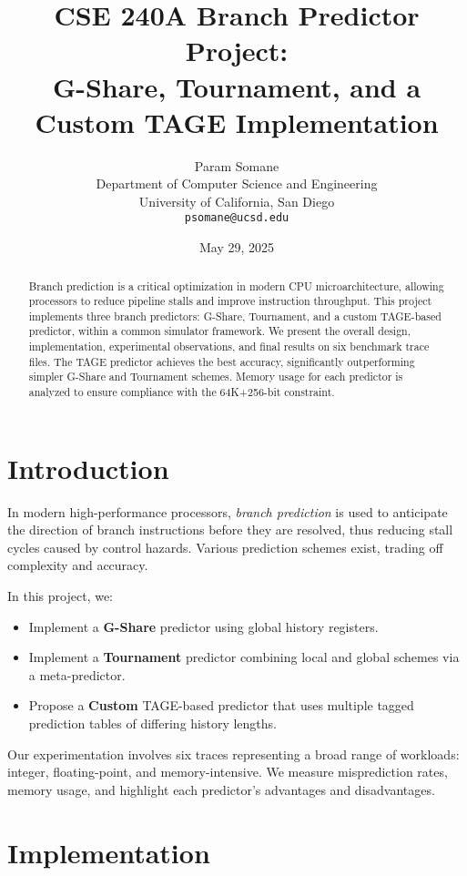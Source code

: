 \documentclass[11pt]{article}
\title{CSE 240A Branch Predictor Project:\\
G-Share, Tournament, and a Custom TAGE Implementation}
\author{%
  Param Somane \\
  Department of Computer Science and Engineering \\
  University of California, San Diego \\
  \texttt{psomane@ucsd.edu}
}
\date{May 29, 2025}
\begin{document}
\maketitle

\begin{abstract}
Branch prediction is a critical optimization in modern CPU microarchitecture, allowing processors to reduce pipeline stalls and improve instruction throughput. This project implements three branch predictors: G-Share, Tournament, and a custom TAGE-based predictor, within a common simulator framework. We present the overall design, implementation, experimental observations, and final results on six benchmark trace files. The TAGE predictor achieves the best accuracy, significantly outperforming simpler G-Share and Tournament schemes. Memory usage for each predictor is analyzed to ensure compliance with the 64K+256-bit constraint.
\end{abstract}

\vspace{1em}

\section{Introduction}
In modern high-performance processors, \emph{branch prediction} is used to anticipate the direction of branch instructions before they are resolved, thus reducing stall cycles caused by control hazards. Various prediction schemes exist, trading off complexity and accuracy.

In this project, we:
\begin{itemize}
    \item Implement a \textbf{G-Share} predictor using global history registers.
    \item Implement a \textbf{Tournament} predictor combining local and global schemes via a meta-predictor.
    \item Propose a \textbf{Custom} TAGE-based predictor that uses multiple tagged prediction tables of differing history lengths.
\end{itemize}
Our experimentation involves six traces representing a broad range of workloads: integer, floating-point, and memory-intensive. We measure misprediction rates, memory usage, and highlight each predictor's advantages and disadvantages.

\section{Implementation}
\end{document}
